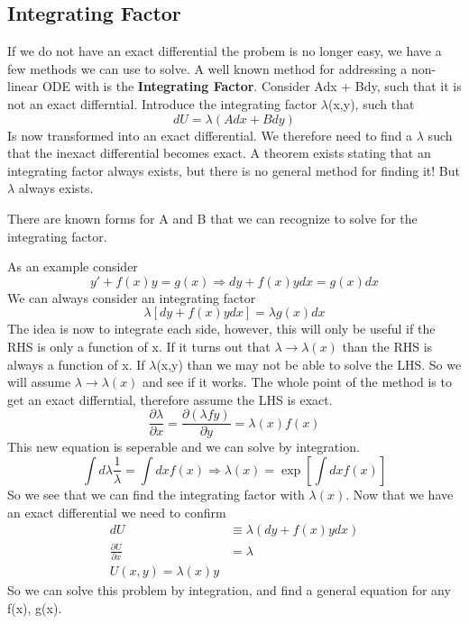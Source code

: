 \documentclass{article}
\newcommand{\be}{\begin{equation}}
\newcommand{\ee}{\end{equation}}
\newcommand{\pd}{\partial}
\begin{document}
\subsection*{Integrating Factor}
If we do not have an exact differential the probem is no longer easy, we have a few methods we can use to solve. 
A well known method for addressing a non-linear ODE with is the \textbf{Integrating Factor}. 
Consider Adx + Bdy, such that it is not an exact differntial. 
Introduce the integrating factor $\lambda$(x,y), such that 
\be
dU = \lambda(Adx + Bdy)
\ee
Is now transformed into an exact differential. 
We therefore need to find a $\lambda$ such that the inexact differential becomes exact. 
A theorem exists stating that an integrating factor always exists, but there is no general method for finding it!
But $\lambda$ always exists. 

There are known forms for A and B that we can recognize to solve for the integrating factor. 

As an example consider
\be
y' + f(x) y = g(x) \Rightarrow dy + f(x) y dx = g(x) dx 
\ee
We can always consider an integrating factor
\be
\lambda \left[dy + f(x) y dx\right] = \lambda g(x) dx 
\ee
The idea is now to integrate each side, however, this will only be useful if the RHS is only a function of x. 
If it turns out that $\lambda \rightarrow \lambda(x)$ than the RHS is always a function of x. 
If $\lambda$(x,y) than we may not be able to solve the LHS.
So we will assume $\lambda \rightarrow \lambda(x)$ and see if it works.
The whole point of the method is to get an exact differntial, therefore assume the LHS is exact.
\be
\frac{\pd\lambda}{\pd x} = \frac{\pd (\lambda f y)}{\pd y} = \lambda(x) f(x)
\ee
This new equation is seperable and we can solve by integration.
\be
\int d\lambda \frac{1}{\lambda} = \int dx f(x) \Rightarrow \lambda(x) = \exp\left[\int dx f(x)\right]
\ee
So we see that we can find the integrating factor with $\lambda(x)$. 
Now that we have an exact differential we need to confirm
\be
\begin{split}
    dU &\equiv \lambda(dy + f(x)ydx)\\
    \frac{\pd U}{\pd x} &= \lambda\\
    U(x,y) = \lambda(x) y
\end{split}
\ee
So we can solve this problem by integration, and find a general equation for any f(x), g(x). 
\end{document}
